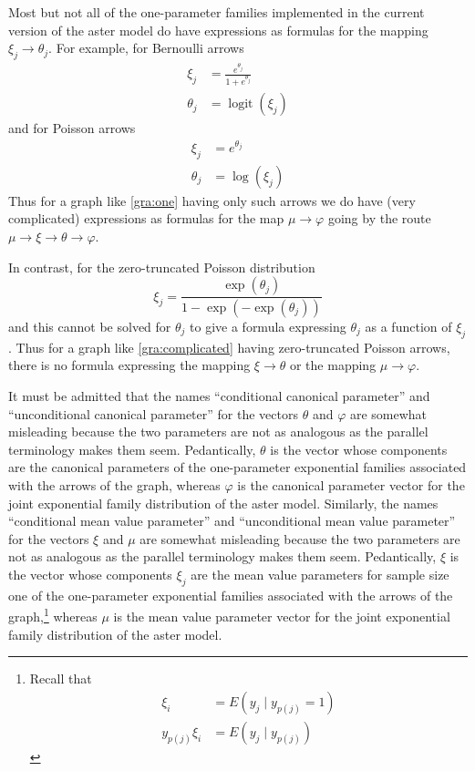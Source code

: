 \documentclass[11pt]{article}
\DeclareMathOperator{\logit}{logit}
\begin{document}
Most but not all of the one-parameter families
implemented in the current version of the aster model do have expressions
as formulas for the mapping $\xi_j \to \theta_j$.
For example, for Bernoulli arrows
\begin{align*}
   \xi_j & = \frac{e^{\theta_j}}{1 + e^{\theta_j}}
   \\
   \theta_j & = \logit(\xi_j)
\end{align*}
and for Poisson arrows
\begin{align*}
   \xi_j & = e^{\theta_j}
   \\
   \theta_j & = \log(\xi_j)
\end{align*}
Thus for a graph like \eqref{gra:one} having only such arrows we do have (very
complicated) expressions as formulas for the map $\mu \to \varphi$ going
by the route $\mu \to \xi \to \theta \to \varphi$.

In contrast, for the zero-truncated Poisson distribution
$$
   \xi_j = \frac{\exp(\theta_j)}{1 - \exp(- \exp(\theta_j))}
$$
and this cannot be solved for $\theta_j$ to give a formula expressing
$\theta_j$ as a function of $\xi_j$.  Thus for a graph like
\eqref{gra:complicated} having zero-truncated Poisson arrows, there is
no formula expressing the mapping $\xi \to \theta$
or the mapping $\mu \to \varphi$.

It must be admitted that the names ``conditional canonical parameter''
and ``unconditional canonical parameter'' for the vectors $\theta$ and $\varphi$
are somewhat misleading because the two parameters are not as analogous
as the parallel terminology makes them seem.  Pedantically, $\theta$ is
the vector whose components are the canonical parameters of the one-parameter
exponential families associated with the arrows of the graph, whereas
$\varphi$ is the canonical parameter vector for the joint exponential family
distribution of the aster model.
Similarly, the names ``conditional mean value parameter''
and ``unconditional mean value parameter'' for the vectors $\xi$ and $\mu$
are somewhat misleading because the two parameters are not as analogous
as the parallel terminology makes them seem.  Pedantically, $\xi$ is
the vector whose components $\xi_j$ are the mean value parameters for sample
size one of the one-parameter
exponential families associated with the arrows
of the graph,\footnote{Recall that \label{foot:xi}
\begin{align*}
    \xi_i & = E(y_j \mid y_{p(j)} = 1)
    \\
    y_{p(j)} \xi_i & = E(y_j \mid y_{p(j)})
\end{align*}}
whereas
$\mu$ is the mean value parameter vector for the joint exponential family
distribution of the aster model.
\end{document}

